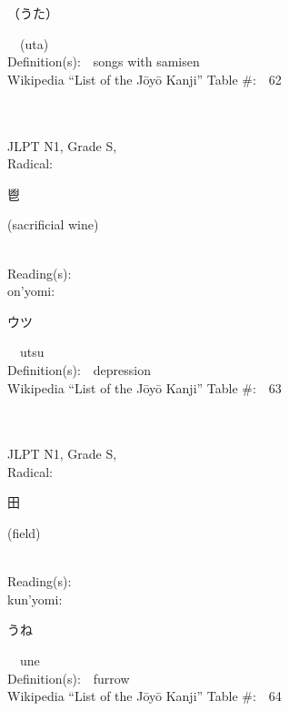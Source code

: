 \begin{multicols}{2}
{\hspace*{2em}}{\begin{CJK}{UTF8}{min} （うた） \end{CJK}}\ \ (uta)\ \ \\
Definition(s):\ \ songs with samisen \\
Wikipedia ``List of the J\=oy\=o Kanji'' Table \#:\ \ 62 \\
\ \ \\
{\fontsize{34pt}{40pt}  }\ \ \\
{JLPT N1, Grade S, \\Radical:\ \ {\begin{CJK}{UTF8}{min} 鬯 \end{CJK}} (sacrificial wine) } \\
Reading(s):\ \ \\
{\hspace*{1em}}on'yomi:\ \ \\
{\hspace*{2em}}{\begin{CJK}{UTF8}{min} ウツ \end{CJK}}\ \ utsu\ \ \\
Definition(s):\ \ depression \\
Wikipedia ``List of the J\=oy\=o Kanji'' Table \#:\ \ 63 \\
\ \ \\
{\fontsize{34pt}{40pt}  }\ \ \\
{JLPT N1, Grade S, \\Radical:\ \ {\begin{CJK}{UTF8}{min} 田 \end{CJK}} (field) } \\
Reading(s):\ \ \\
{\hspace*{1em}}kun'yomi:\ \ \\
{\hspace*{2em}}{\begin{CJK}{UTF8}{min} うね \end{CJK}}\ \ une\ \ \\
Definition(s):\ \ furrow \\
Wikipedia ``List of the J\=oy\=o Kanji'' Table \#:\ \ 64 \\
\ \ \\
{\fontsize{34pt}{40pt}  }\ \ \\

\end{multicols}
